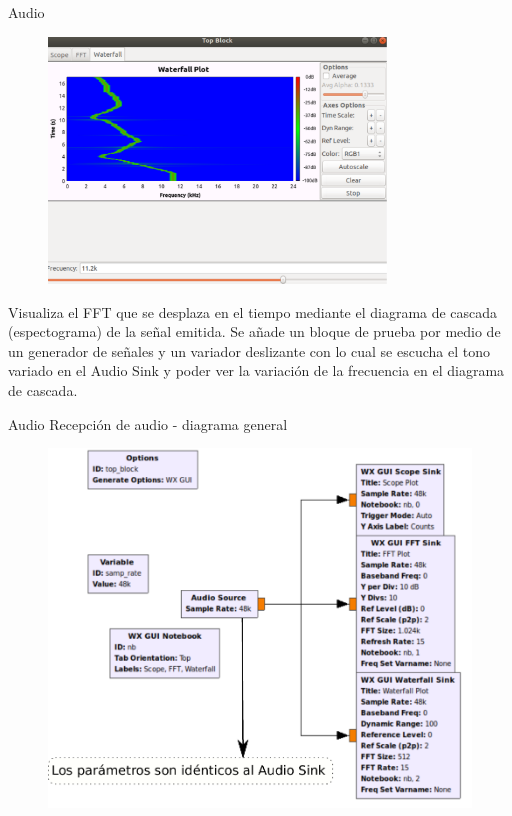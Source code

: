 \begin{frame}{Audio}

\begin{figure}

\begin{center}
\vspace{-6mm}
\includegraphics[width=0.8\textwidth]{lab3/pdf/lab3_6.pdf}
\end{center}
\end{figure}
\vspace{-3mm}
\tiny
Visualiza el FFT que se desplaza en el tiempo mediante el diagrama de cascada (espectograma) de la señal emitida. Se añade un bloque de prueba por medio de un generador de señales y un variador deslizante con lo cual se escucha el tono variado en el Audio Sink y poder ver la variación de la frecuencia en el diagrama de cascada.
\end{frame}

\begin{frame}{Audio}
\scriptsize
Recepción de audio - diagrama general
\begin{figure}

\begin{center}
\includegraphics[width=.73\textwidth]{lab3/pdf/lab3_7.pdf}
\end{center}
\end{figure}

\end{frame}

